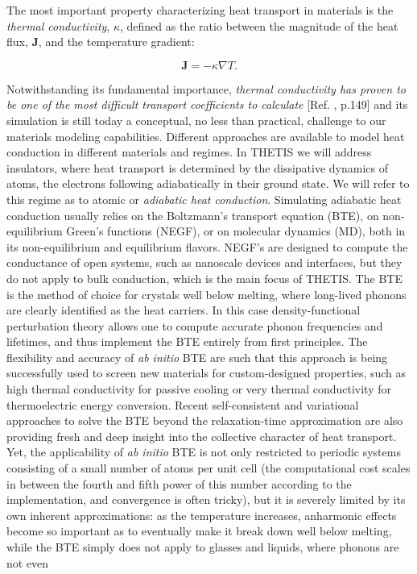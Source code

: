 The most important property characterizing heat transport in materials is the \emph{thermal conductivity}, $\kappa$, defined as the ratio between the magnitude of the heat flux, $\mathbf{J}$, and the temperature gradient:
\begin{linenomath}\begin{equation}
\mathbf{J}= -\kappa \nabla T. \label{eq:kappa}
\end{equation}\end{linenomath}
Notwithstanding its fundamental importance, \emph{thermal conductivity has proven to be one of the most difficult transport coefficients to calculate} [Ref. , p.149] and its simulation is still today a conceptual, no less than practical, challenge to our materials modeling capabilities. Different approaches are available to model heat conduction in different materials and regimes. In THETIS we will address insulators, where heat transport is determined by the dissipative dynamics of atoms, the electrons following adiabatically in their ground state. We will refer to this regime as to atomic or \emph{adiabatic heat conduction}. Simulating adiabatic heat conduction usually relies on the Boltzmann's transport equation (BTE),\cite{Peierls1929,Zhou2016} on non-equilibrium Green's functions (NEGF), \cite{Wang2008} or on molecular dynamics (MD),\cite{Allen1989,Frenkel2001} both in its non-equilibrium and equilibrium flavors. NEGF's are designed to compute the conductance of open systems, such as nanoscale devices and interfaces, but they do not apply to bulk conduction, which is the main focus of THETIS. The BTE is the method of choice for crystals well below melting, where long-lived phonons are clearly identified as the heat carriers. In this case density-functional perturbation theory\cite{Baroni1987a,Gonze1989,Baroni2001} allows one to compute accurate phonon frequencies \cite{Giannozzi1991} and lifetimes,\cite{Debernardi1995,Paulatto2013} and thus implement the BTE entirely from first principles.\cite{Broido:2007iu} The flexibility and accuracy of \emph{ab initio} BTE are such that this approach is being successfully used to screen new materials for custom-designed properties, such as high thermal conductivity for passive cooling\cite{Lindsay:2013fw,Lindsay:2013db} or very thermal conductivity for thermoelectric energy conversion.\cite{PhysRevX.4.011019,Schwingen2014} Recent self-consistent and variational approaches to solve the BTE beyond the relaxation-time approximation \cite{Fugallo2013} are also providing fresh and deep insight into the collective character of heat transport.\cite{Fugallo2013,Lee:2015ex,Cepellotti2015,Cepellotti:2016bk} Yet, the applicability of \emph{ab initio} BTE is not only restricted to periodic systems consisting of a small number of atoms per unit cell (the computational cost scales in between the fourth and fifth power of this number according to the implementation, and convergence is often tricky), but it is severely limited by its own inherent approximations: as the temperature increases, anharmonic effects become so important as to eventually make it break down well below melting,\cite{Turney:2009bb} while the BTE simply does not apply to glasses and liquids, where phonons are not even 